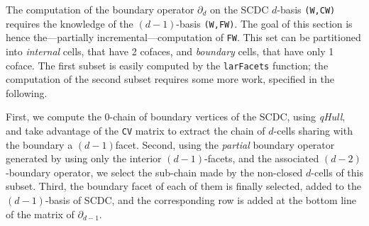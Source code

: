 \documentclass[11pt,oneside]{article}	%
\begin{document}
The computation of the boundary operator $\partial_d$ on the SCDC $d$-basis \texttt{(W,CW)} requires the knowledge of the $(d-1)$-basis \texttt{(W,FW)}. The goal of this section is hence the---partially incremental---computation of \texttt{FW}. This set can be partitioned into \emph{internal} cells, that have 2 cofaces, and \emph{boundary} cells, that have only 1 coface. The first subset is easily computed by the \texttt{larFacets} function; the computation of the second subset requires some more work, specified in the following.

First, we compute the 0-chain of boundary vertices of the SCDC, using \emph{qHull}, and take advantage of the \texttt{CV} matrix to extract the chain of $d$-cells sharing with the boundary a $(d-1)$facet. Second, using the \emph{partial} boundary operator generated by using only the interior $(d-1)$-facets, and the associated $(d-2)$-boundary operator, we select the sub-chain made by the non-closed $d$-cells of this subset. Third, the boundary facet of each of them is finally selected, added to the $(d-1)$-basis of SCDC, and the corresponding row is added at the bottom line of the matrix of $\partial_{d-1}$.
\end{document}
